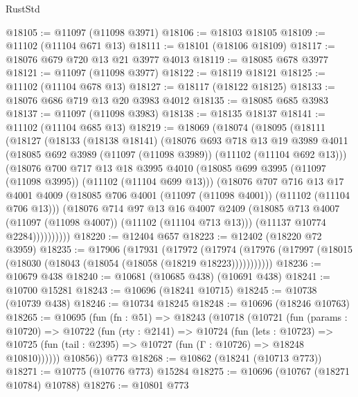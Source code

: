 \begin{lexlean}{RustStd}
\begin{coremodule}
@18105 := @11097 (@11098 @3971)
@18106 := @18103 @18105
@18109 := @11102 (@11104 @671 @13)
@18111 := @18101 (@18106 @18109)
@18117 := @18076 @679 @720 @13 @21 @3977 @4013
@18119 := @18085 @678 @3977
@18121 := @11097 (@11098 @3977)
@18122 := @18119 @18121
@18125 := @11102 (@11104 @678 @13)
@18127 := @18117 (@18122 @18125)
@18133 := @18076 @686 @719 @13 @20 @3983 @4012
@18135 := @18085 @685 @3983
@18137 := @11097 (@11098 @3983)
@18138 := @18135 @18137
@18141 := @11102 (@11104 @685 @13)
@18219 := @18069
    (@18074
      (@18095
        (@18111
          (@18127
            (@18133
              (@18138 @18141)
              (@18076
                @693
                @718
                @13
                @19
                @3989
                @4011
                (@18085 @692 @3989 (@11097 (@11098 @3989)) (@11102 (@11104 @692 @13)))
                (@18076
                  @700
                  @717
                  @13
                  @18
                  @3995
                  @4010
                  (@18085 @699 @3995 (@11097 (@11098 @3995)) (@11102 (@11104 @699 @13)))
                  (@18076
                    @707
                    @716
                    @13
                    @17
                    @4001
                    @4009
                    (@18085 @706 @4001 (@11097 (@11098 @4001)) (@11102 (@11104 @706 @13)))
                    (@18076
                      @714
                      @97
                      @13
                      @16
                      @4007
                      @2409
                      (@18085 @713 @4007 (@11097 (@11098 @4007)) (@11102 (@11104 @713 @13)))
                      (@11137 @10774 @2284))))))))))
@18220 := @12404 @657
@18223 := @12402 (@18220 @72 @3959)
@18235 := @17906
    (@17931
      (@17972
        (@17974 (@17976 (@17997 (@18015 (@18030 (@18043 (@18054 (@18058 (@18219 @18223)))))))))))
@18236 := @10679 @438
@18240 := @10681 (@10685 @438) (@10691 @438)
@18241 := @10700 @15281
@18243 := @10696 (@18241 @10715)
@18245 := @10738 (@10739 @438)
@18246 := @10734 @18245
@18248 := @10696 (@18246 @10763)
@18265 := @10695
    (fun (fn : @51) =>
    @18243
      (@10718
        (@10721
          (fun (params : @10720) =>
          @10722
            (fun (rty : @2141) =>
            @10724
              (fun (lets : @10723) =>
              @10725 (fun (tail : @2395) => @10727 (fun (Γ : @10726) => @18248 @10810))))))
        @10856))
    @773
@18268 := @10862 (@18241 (@10713 @773))
@18271 := @10775 (@10776 @773) @15284
@18275 := @10696 (@10767 (@18271 @10784) @10788)
@18276 := @10801 @773

\end{coremodule}
\end{lexlean}
